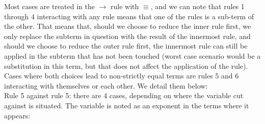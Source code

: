 \begin{myproof}
Most cases are treated in the $\to$ rule with $\equiv$, and we can note that rules 1 through 4 interacting with any rule means that one of the rules is a sub-term of the other. That means that, should we choose to reduce the inner rule first, we only replace the subterm in question with the result of the innermost rule, and should we choose to reduce the outer rule first, the innermost rule can still be applied in the subterm that has not been touched (worst case scenario would be a substitution in this term, but that does not affect the application of the rule). Cases where both choices lead to non-strictly equal terms are rules 5 and 6 interacting with themselves or each other. We detail them below:\\
Rule 5 against rule 5: there are 4 cases, depending on where the variable cut against is situated. The variable is noted as an exponent in the terms where it appears:\\
{}\\
\\
\\
\end{myproof}
